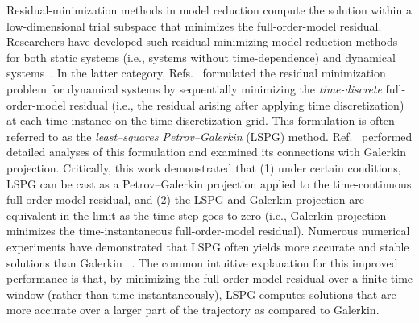 \documentclass[3p,computermodern,10pt]{elsarticle}
\begin{document}
Residual-minimization methods in model reduction compute the solution within a
low-dimensional trial subspace that minimizes the full-order-model residual.
Researchers have developed such residual-minimizing model-reduction methods
for both static systems (i.e., systems without time-dependence)
\cite{legresley_1,legresley_2,legresley_3,bui_resmin_steady,rovas_thesis,carlberg_thesis,bui_thesis}
and dynamical
systems~\cite{bui_thesis,bui_unsteady,carlberg_thesis,carlberg_gnat,carlberg_lspg,carlberg_lspg_v_galerkin}.
In the latter category,
Refs.~\cite{bui_thesis,bui_unsteady,carlberg_thesis,carlberg_gnat,carlberg_lspg}
formulated the residual minimization problem for dynamical systems by
sequentially minimizing the \textit{time-discrete} full-order-model residual
(i.e., the residual arising after applying time discretization) at each time
instance on the time-discretization grid. This formulation is often referred
to as the \textit{least--squares Petrov--Galerkin} (LSPG) method.
Ref.~\cite{carlberg_lspg_v_galerkin} performed detailed analyses of this
formulation and examined its connections with Galerkin projection. Critically,
this work demonstrated that (1) under certain conditions, LSPG can be cast as a 
Petrov--Galerkin projection applied to the time-continuous
full-order-model residual, and (2) the LSPG and Galerkin projection are equivalent
in the limit as the time step goes to zero (i.e., Galerkin projection 
minimizes the time-instantaneous full-order-model residual). Numerous
numerical experiments have demonstrated that LSPG often yields more
accurate and stable solutions than Galerkin
~\cite{bui_thesis,carlberg_lspg_v_galerkin,carlberg_gnat,carlberg_thesis,parish_apg}.
The common intuitive explanation for this improved performance is that, by
minimizing the full-order-model residual over a finite time window (rather
than time instantaneously), LSPG computes solutions that are more
accurate over a larger part of the trajectory as compared to Galerkin.
\end{document}
